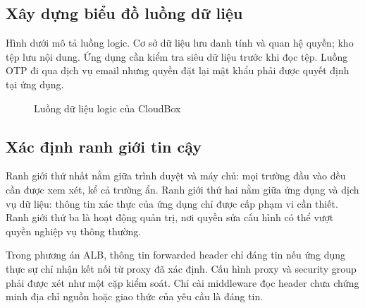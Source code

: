 \subsection{Xây dựng biểu đồ luồng dữ liệu}
Hình dưới mô tả luồng logic. Cơ sở dữ liệu lưu danh tính và quan hệ quyền; kho tệp lưu nội dung. Ứng dụng cần kiểm tra siêu dữ liệu trước khi đọc tệp. Luồng OTP đi qua dịch vụ email nhưng quyền đặt lại mật khẩu phải được quyết định tại ứng dụng.
\begin{figure}[htbp]
\centering
{}
\caption{Luồng dữ liệu logic của CloudBox}
\label{fig:dfd}
\end{figure}
\subsection{Xác định ranh giới tin cậy}
Ranh giới thứ nhất nằm giữa trình duyệt và máy chủ: mọi trường đầu vào đều cần được xem xét, kể cả trường ẩn. Ranh giới thứ hai nằm giữa ứng dụng và dịch vụ dữ liệu: thông tin xác thực của ứng dụng chỉ được cấp phạm vi cần thiết. Ranh giới thứ ba là hoạt động quản trị, nơi quyền sửa cấu hình có thể vượt quyền nghiệp vụ thông thường.

Trong phương án ALB, thông tin forwarded header chỉ đáng tin nếu ứng dụng thực sự chỉ nhận kết nối từ proxy đã xác định. Cấu hình proxy và security group phải được xét như một cặp kiểm soát. Chỉ cài middleware đọc header chưa chứng minh địa chỉ nguồn hoặc giao thức của yêu cầu là đáng tin.
